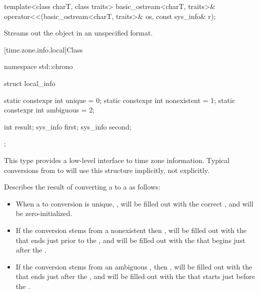 \begin{itemdecl}
template<class charT, class traits>
  basic_ostream<charT, traits>&
    operator<<(basic_ostream<charT, traits>& os, const sys_info& r);
\end{itemdecl}

\begin{itemdescr}
\pnum
\effects
Streams out the  object  in an unspecified format.
\end{itemdescr}

[time.zone.info.local]{Class }

%
%
%
%
%
%
\begin{codeblock}
namespace std::chrono {
  struct local_info {
    static constexpr int unique      = 0;
    static constexpr int nonexistent = 1;
    static constexpr int ambiguous   = 2;

    int result;
    sys_info first;
    sys_info second;
  };
}
\end{codeblock}

\pnum
\begin{note}
This type provides a low-level interface to time zone information.
Typical conversions from  to 
will use this structure implicitly, not explicitly.
\end{note}

\pnum
Describes the result of converting a  to a 
as follows:
\begin{itemize}
\item
When a  to  conversion is unique,
,
 will be filled out with the correct ,
and
 will be zero-initialized.

\item
If the conversion stems from a nonexistent 
then ,
 will be filled out with the 
that ends just prior to the ,
and
 will be filled out with the 
that begins just after the .

\item
If the conversion stems from an ambiguous ,
then ,
 will be filled out with the 
that ends just after the ,
and
 will be filled out with the 
that starts just before the .
\end{itemize}

